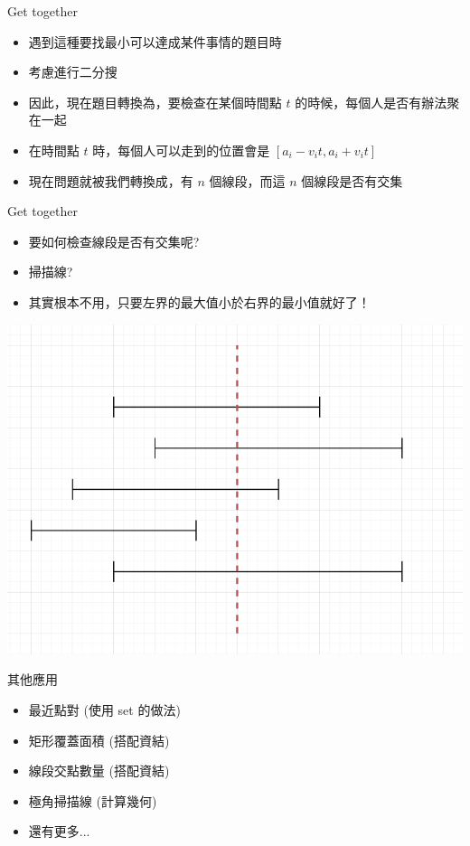 \documentclass[aspectratio=169]{beamer}
\begin{document}
    \begin{frame}{Get together}
        \begin{itemize}
            \item 遇到這種要找最小可以達成某件事情的題目時
            \item 考慮進行二分搜
            \item<2-> 因此，現在題目轉換為，要檢查在某個時間點 $t$ 的時候，每個人是否有辦法聚在一起
            \item<3-> 在時間點 $t$ 時，每個人可以走到的位置會是 $[a_i-v_it,a_i+v_it]$
            \item<4-> 現在問題就被我們轉換成，有 $n$ 個線段，而這 $n$ 個線段是否有交集
        \end{itemize}
    \end{frame}
    
    \begin{frame}{Get together}
        \begin{itemize}
            \item 要如何檢查線段是否有交集呢?
            \item<2-> 掃描線?
            \item<3-> 其實根本不用，只要左界的最大值小於右界的最小值就好了！
        \end{itemize}
        
        \begin{center}
            \includegraphics[scale=0.35]{images/sweep_line_3.png}
        \end{center}
    \end{frame}
    
    \begin{frame}{其他應用}
        \begin{itemize}
            \item 最近點對 (使用 set 的做法)
            \item 矩形覆蓋面積 (搭配資結)
            \item 線段交點數量 (搭配資結)
            \item 極角掃描線 (計算幾何)
            \item 還有更多...
        \end{itemize}
    \end{frame}
    
\end{document}

